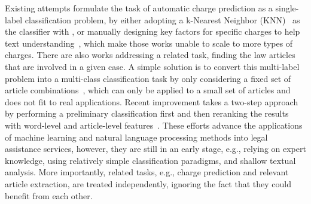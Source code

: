 Existing attempts formulate the task of automatic charge prediction as a single-label classification problem, 
by either adopting a k-Nearest Neighbor (KNN)~\cite{LIU2004case,liu2006exploring} as the classifier 
with ,
or manually designing key factors for specific charges to help text understanding~\cite{lin2012exploiting},
which make those works unable to scale to more types of charges. 
There are also works addressing a related task, finding the law articles that are involved in a given case.
A simple solution is to convert  this multi-label problem 
into a multi-class classification task by only considering a fixed set of article 
combinations~\cite{liu2005classifying,liu2006exploring}, which
can only be applied to a small set of articles and does not fit to real applications.  
Recent improvement takes a two-step approach by performing 
a preliminary classification first and then reranking the results with word-level and article-level features~\cite{liu2015predicting}. 
These efforts  advance the applications of machine learning and natural language processing methods into legal assistance services, however, they are still in an early stage, e.g., relying on expert knowledge, %
using relatively simple classification paradigms, and shallow textual analysis. More importantly, related tasks, e.g., charge prediction and relevant article extraction,  are 
treated independently, 
ignoring the fact that they could benefit from each other.  


